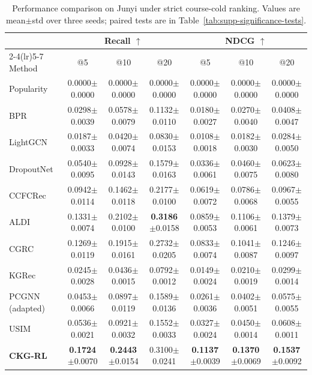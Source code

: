 \documentclass[letterpaper]{article}
\newcommand{\sd}[1]{{\footnotesize$\pm$#1}}
\newcommand{\tablecaptiongap}{\vspace{0.35em}}
\begin{document}
\begin{table}[t]
\centering
\caption{Performance comparison on Junyi under strict course-cold ranking. Values are mean\(\pm\)std over three seeds; paired tests are in Table~\ref{tab:supp-significance-tests}.}
\label{tab:supp-junyi-cold}
\tablecaptiongap
\small
\begin{tabular*}{\textwidth}{@{\extracolsep{\fill}}lcccccc}
\toprule
& \multicolumn{3}{c}{Recall \(\uparrow\)} & \multicolumn{3}{c}{NDCG \(\uparrow\)} \\
\cmidrule(lr){2-4}\cmidrule(lr){5-7}
Method & \multicolumn{1}{c}{@5} & \multicolumn{1}{c}{@10} & \multicolumn{1}{c}{@20} & \multicolumn{1}{c}{@5} & \multicolumn{1}{c}{@10} & \multicolumn{1}{c}{@20} \\
\midrule
Popularity & 0.0000\sd{0.0000} & 0.0000\sd{0.0000} & 0.0000\sd{0.0000} & 0.0000\sd{0.0000} & 0.0000\sd{0.0000} & 0.0000\sd{0.0000} \\
BPR & 0.0298\sd{0.0039} & 0.0578\sd{0.0079} & 0.1132\sd{0.0110} & 0.0180\sd{0.0027} & 0.0270\sd{0.0040} & 0.0408\sd{0.0047} \\
LightGCN & 0.0187\sd{0.0033} & 0.0420\sd{0.0074} & 0.0830\sd{0.0153} & 0.0108\sd{0.0018} & 0.0182\sd{0.0030} & 0.0284\sd{0.0050} \\
DropoutNet & 0.0540\sd{0.0095} & 0.0928\sd{0.0143} & 0.1579\sd{0.0163} & 0.0336\sd{0.0061} & 0.0460\sd{0.0075} & 0.0623\sd{0.0080} \\
CCFCRec & 0.0942\sd{0.0114} & 0.1462\sd{0.0118} & 0.2177\sd{0.0100} & 0.0619\sd{0.0072} & 0.0786\sd{0.0068} & 0.0967\sd{0.0055} \\
ALDI & 0.1331\sd{0.0074} & 0.2102\sd{0.0100} & \textbf{0.3186}\sd{0.0158} & 0.0859\sd{0.0053} & 0.1106\sd{0.0061} & 0.1379\sd{0.0073} \\
CGRC & 0.1269\sd{0.0119} & 0.1915\sd{0.0161} & 0.2732\sd{0.0205} & 0.0833\sd{0.0074} & 0.1041\sd{0.0087} & 0.1246\sd{0.0097} \\
KGRec & 0.0245\sd{0.0028} & 0.0436\sd{0.0015} & 0.0792\sd{0.0012} & 0.0149\sd{0.0024} & 0.0210\sd{0.0019} & 0.0299\sd{0.0014} \\
PCGNN (adapted) & 0.0453\sd{0.0066} & 0.0897\sd{0.0119} & 0.1589\sd{0.0136} & 0.0261\sd{0.0036} & 0.0402\sd{0.0051} & 0.0575\sd{0.0055} \\
USIM & 0.0536\sd{0.0021} & 0.0921\sd{0.0032} & 0.1552\sd{0.0033} & 0.0327\sd{0.0024} & 0.0450\sd{0.0014} & 0.0608\sd{0.0011} \\
\textbf{CKG-RL} & \textbf{0.1724}\sd{0.0070} & \textbf{0.2443}\sd{0.0154} & 0.3100\sd{0.0241} & \textbf{0.1137}\sd{0.0039} & \textbf{0.1370}\sd{0.0069} & \textbf{0.1537}\sd{0.0092} \\
\bottomrule
\end{tabular*}
\end{table}
\end{document}
